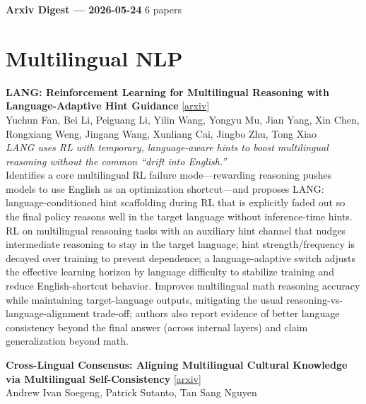 \documentclass[12pt,letterpaper]{article}
\begin{document}
{\footnotesize\textbf{Arxiv Digest --- 2026-05-24} \hfill 6 papers}

\smallskip

\section*{Multilingual NLP}

{\small\textbf{LANG: Reinforcement Learning for Multilingual Reasoning with Language-Adaptive Hint Guidance}} {\scriptsize[\href{https://arxiv.org/abs/2605.22567}{arxiv}]}\\
{\scriptsize Yuchun Fan, Bei Li, Peiguang Li, Yilin Wang, Yongyu Mu, Jian Yang, Xin Chen, Rongxiang Weng, Jingang Wang, Xunliang Cai, Jingbo Zhu, Tong Xiao}\\

{\small\textit{LANG uses RL with temporary, language-aware hints to boost multilingual reasoning without the common ``drift into English.''}}\\[1pt]
{\footnotesize Identifies a core multilingual RL failure mode---rewarding reasoning pushes models to use English as an optimization shortcut---and proposes LANG: language-conditioned hint scaffolding during RL that is explicitly faded out so the final policy reasons well in the target language without inference-time hints. RL on multilingual reasoning tasks with an auxiliary hint channel that nudges intermediate reasoning to stay in the target language; hint strength/frequency is decayed over training to prevent dependence; a language-adaptive switch adjusts the effective learning horizon by language difficulty to stabilize training and reduce English-shortcut behavior. Improves multilingual math reasoning accuracy while maintaining target-language outputs, mitigating the usual reasoning-vs-language-alignment trade-off; authors also report evidence of better language consistency beyond the final answer (across internal layers) and claim generalization beyond math.}

\medskip

{\small\textbf{Cross-Lingual Consensus: Aligning Multilingual Cultural Knowledge via Multilingual Self-Consistency}} {\scriptsize[\href{https://arxiv.org/abs/2605.22137}{arxiv}]}\\
{\scriptsize Andrew Ivan Soegeng, Patrick Sutanto, Tan Sang Nguyen}\\
\end{document}
